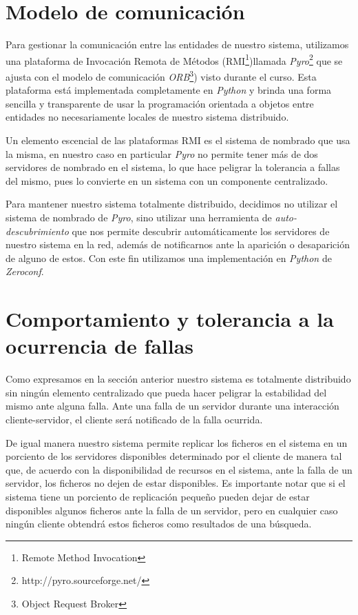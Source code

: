 \documentclass{article}
\begin{document}
\section{Modelo de comunicación}

Para gestionar la comunicación entre las entidades de nuestro sistema,
utilizamos una plataforma de Invocación Remota de Métodos (RMI\footnote{Remote
Method  Invocation})llamada \emph{Pyro}\footnote{http://pyro.sourceforge.net/}
que se ajusta con el modelo de comunicación \emph{ORB}\footnote{Object Request
Broker}) visto durante el curso. Esta plataforma está implementada
completamente en \emph{Python} y brinda una forma sencilla y transparente de
usar la programación orientada a objetos entre entidades no necesariamente
locales de nuestro sistema distribuido.

Un elemento escencial de las plataformas RMI es el sistema de nombrado que usa
la misma, en nuestro caso en particular \emph{Pyro} no permite tener más de dos
servidores de nombrado en el sistema, lo que hace peligrar la tolerancia a
fallas del mismo, pues lo convierte en un sistema con un componente
centralizado. 

Para mantener nuestro sistema totalmente distribuido, decidimos
no utilizar el sistema de nombrado de \emph{Pyro}, sino utilizar una
herramienta de \emph{auto-descubrimiento} que nos permite descubrir
automáticamente los servidores de nuestro sistema en la red, además de
notificarnos ante la aparición o desaparición de alguno de estos. Con este fin
utilizamos una implementación en \emph{Python} de \emph{Zeroconf}.

\section{Comportamiento y tolerancia a la ocurrencia de fallas}

Como expresamos en la sección anterior nuestro sistema es totalmente
distribuido sin ningún elemento centralizado que pueda hacer peligrar la
estabilidad del mismo ante alguna falla. Ante una falla de un servidor durante
una interacción cliente-servidor, el cliente será notificado de la falla
ocurrida.

De igual manera nuestro sistema permite replicar los ficheros en el sistema en
un porciento de los servidores disponibles determinado por el cliente de
manera tal que, de acuerdo con la disponibilidad de recursos en el sistema,
ante la falla de un servidor, los ficheros no dejen de estar disponibles. Es
importante notar que si el sistema tiene un porciento de replicación pequeño
pueden dejar de estar disponibles algunos ficheros ante la falla de un
servidor, pero en cualquier caso ningún cliente obtendrá estos ficheros como
resultados de una búsqueda.
\end{document}
